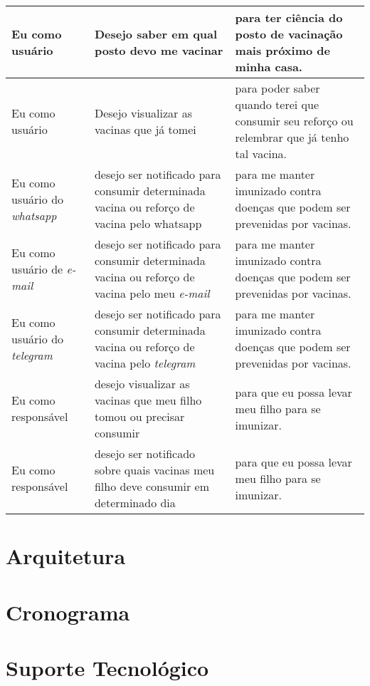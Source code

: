 \begin{center}
    \begin{tabular}{|m{12em}|m{12em}|m{12em}|}
         \hline
         Eu como usuário & Desejo saber em qual posto devo me vacinar & para ter ciência do posto de vacinação mais próximo de minha casa. \\
         \hline
         Eu como usuário & Desejo visualizar as vacinas que já tomei & para poder saber quando terei que consumir seu reforço ou relembrar que já tenho tal vacina. \\
         \hline
         Eu como usuário do \textit{whatsapp} & desejo ser notificado para consumir determinada vacina ou reforço de vacina pelo whatsapp & para me manter imunizado contra doenças que podem ser prevenidas por vacinas. \\ 
         \hline
         Eu como usuário de \textit{e-mail} & desejo ser notificado para consumir determinada vacina ou reforço de vacina pelo meu \textit{e-mail} & para me manter imunizado contra doenças que podem ser prevenidas por vacinas. \\ 
         \hline
         Eu como usuário do \textit{telegram} & desejo ser notificado para consumir determinada vacina ou reforço de vacina pelo \textit{telegram} & para me manter imunizado contra doenças que podem ser prevenidas por vacinas. \\ 
         \hline
         Eu como responsável & desejo visualizar as vacinas que meu filho tomou ou precisar consumir & para que eu possa levar meu filho para se imunizar. \\
         \hline
         Eu como responsável & desejo ser notificado sobre quais vacinas meu filho deve consumir em determinado dia & para que eu possa levar meu filho para se imunizar. \\
         \hline
    \end{tabular}
\end{center}

\section{Arquitetura}

\section{Cronograma}

\section{Suporte Tecnológico}

